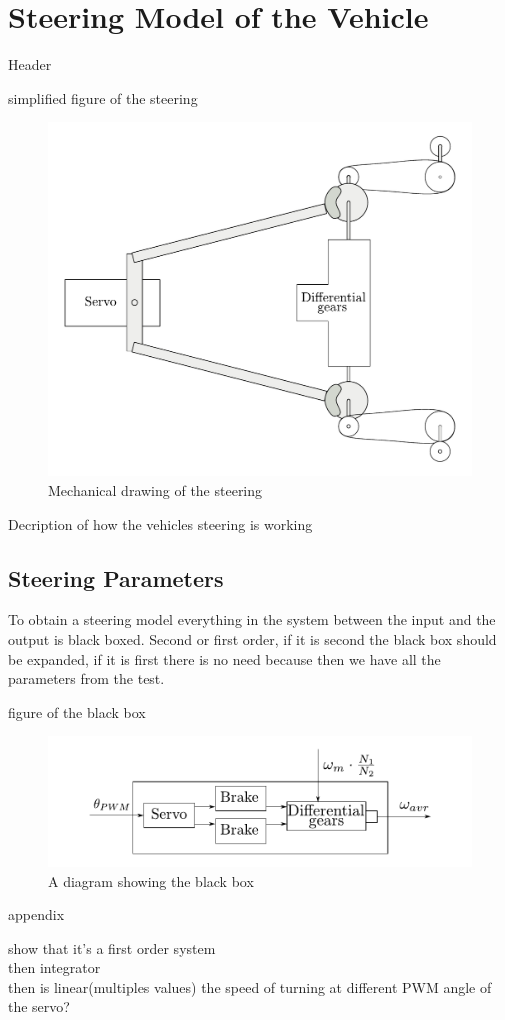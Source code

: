 \section{Steering Model of the Vehicle}\label{sec:SteeringModel}
Header

simplified figure of the steering
 \begin{figure}[H]
 	\centering
 	\includegraphics[scale=0.6]{figures/steeringMechanical.pdf}
 	\caption{Mechanical drawing of the steering}
 	\label{steeringMechanical}
 \end{figure}

Decription of how the vehicles steering is working

\subsection{Steering Parameters}
 To obtain a steering model everything in the system between the input and the output is black boxed. Second or first order, if it is second the black box should be expanded, if it is first there is no need because then we have all the parameters from the test.
 
 figure of the black box
 \begin{figure}[H]
 	\centering
 	\includegraphics[scale=1]{figures/steeringDiagramBlackBox.pdf}
 	\caption{A diagram showing the black box}
 	\label{steeringDiagramBlackBox}
 \end{figure}
 
 appendix
 
show that it's a first order system\\
then integrator\\
then is linear(multiples values) the speed of turning at different PWM angle of the servo?
